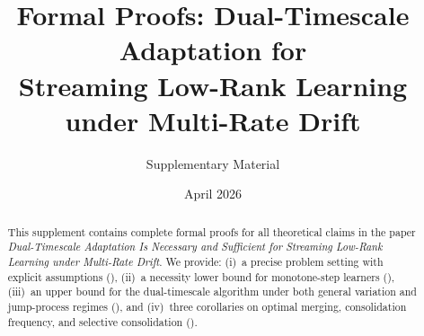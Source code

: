 \documentclass[11pt,a4paper]{article}
\title{Formal Proofs: Dual-Timescale Adaptation for\\Streaming Low-Rank Learning under Multi-Rate Drift}
\author{Supplementary Material}
\date{April 2026}
\begin{document}
\maketitle

\begin{abstract}
This supplement contains complete formal proofs for all theoretical claims
in the paper \emph{Dual-Timescale Adaptation Is Necessary and Sufficient
for Streaming Low-Rank Learning under Multi-Rate Drift}.
We provide: (i)~a precise problem setting with explicit assumptions
(), (ii)~a necessity lower bound for monotone-step
learners (), (iii)~an upper bound for the dual-timescale
algorithm under both general variation and jump-process regimes
(), and (iv)~three corollaries on optimal merging,
consolidation frequency, and selective consolidation ().
\end{abstract}

\tableofcontents
\newpage









% 
\end{document}
